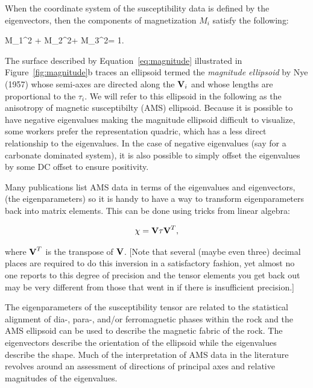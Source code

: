 When the coordinate system of the susceptibility data is defined by the eigenvectors,
then the components of magnetization $M_i$ satisfy the following:

 \beq
{{M_1^2}} +
{{M_2^2}}+
{{M_3^2}}= 1.
\label{eq:magnitude}
\eeq

The surface described by
Equation~\ref{eq:magnitude} illustrated 
in Figure~\ref{fig:magnitude}b traces an ellipsoid termed 
the 
{\it magnitude ellipsoid} by  
Nye (1957)\nocite{nye57}
 whose semi-axes are directed along the  $\hbox{\bf V}_i$  and whose lengths
are proportional to the $\tau_i$.  We will refer to
this ellipsoid in the following as the 
anisotropy of magnetic susceptibilty
(AMS) ellipsoid.   Because it is possible to have negative eigenvalues making the magnitude ellipsoid difficult to visualize, some workers prefer the representation quadric, which has a less direct relationship to the eigenvalues.  In the case of negative eigenvalues (say for a carbonate dominated system), it is also possible to simply offset the eigenvalues by some DC offset to ensure positivity.  

Many publications list AMS data in terms of the eigenvalues and eigenvectors,
(the eigenparameters)  so it is handy to have a way to transform eigenparameters back into matrix elements.  This can be 
done using tricks from linear algebra:

\begin{equation}
{{\bf \chi}= \hbox{\bf V}{\bf  \tau} \hbox{\bf V}}^T,
\label{eq:eigsdj} 
\end{equation}

\noindent where $\hbox{\bf V}^T$ is the transpose of $\hbox{\bf V}$.   [Note that several (maybe even three) decimal places are required to do this inversion  in a satisfactory fashion, yet almost no one reports to this degree of precision and the tensor elements you get back out may be very different from those that went in if there is insufficient precision.] 


The eigenparameters of the
susceptibility tensor are related to the statistical alignment of dia-,
para-, and/or ferromagnetic
phases within the rock and the AMS ellipsoid 
can be used to describe the magnetic fabric of the rock. The eigenvectors describe the 
orientation of the ellipsoid while the eigenvalues describe the shape. 
 Much of the interpretation of 
AMS data  in the literature revolves around an assessment of
 directions of principal axes and relative magnitudes of the eigenvalues.  

